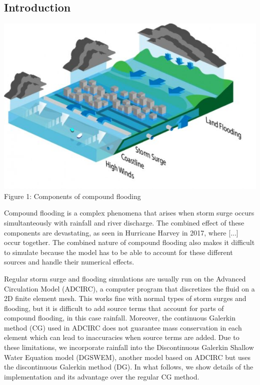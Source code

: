 \documentclass[american]{article}
\begin{document}
\hrulefill
\vspace{10mm}
\fontsize{30}{36}\selectfont
\setlength{\columnsep}{1cm}
\vspace{-1.00cm}
\begin{multicols}{3}
\noindent

\section*{Introduction}

\begin{center}
  \vspace{5mm}
  \includegraphics[width=0.95\linewidth]{media/compound.jpg}
  Figure 1: Components of compound flooding
\end{center}

\noindent Compound flooding is a complex phenomena that arises when storm surge occurs simultanteously with rainfall and river discharge. The combined effect of these components are devastating, as seen in Hurricane Harvey in 2017, where [...] occur together. The combined nature of compound flooding also makes it difficult to simulate because the model has to be able to account for these different sources and handle their numerical effects.

Regular storm surge and flooding simulations are usually run on the Advanced Circulation Model (ADCIRC), a computer program that discretizes the fluid on a 2D finite element mesh. This works fine with normal types of storm surges and flooding, but it is difficult to add source terms that account for parts of compound flooding, in this case rainfall. Moreover, the continuous Galerkin method (CG) used in ADCIRC does not guarantee mass conservation in each element which can lead to inaccuracies when source terms are added.
Due to these limitations, we incorporate rainfall into the Discontinuous Galerkin Shallow Water Equation model (DGSWEM), another model based on ADCIRC but uses the discontinuous Galerkin method (DG). In what follows, we show details of the implementation and its advantage over the regular CG method.


\end{multicols}
\end{document}
